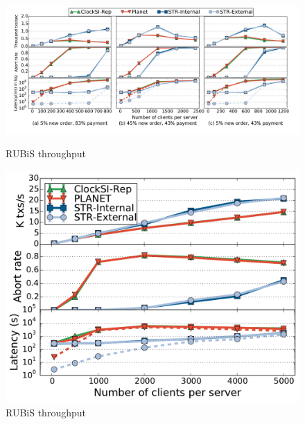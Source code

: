 \begin{figure}
\centering
\begin{minipage}{.73\textwidth}
\hspace{-5mm}
\centering
  \includegraphics[scale=0.31]{figures/tpcc}
  \caption{RUBiS throughput}
  \label{fig:tpcc_result}
\end{minipage}
\begin{minipage}{.25\textwidth}
\centering
  \includegraphics[scale=0.27]{figures/rubislatencywarehouse}
  \caption{RUBiS throughput}
  \label{fig:rubis}
\end{minipage}
\end{figure}

